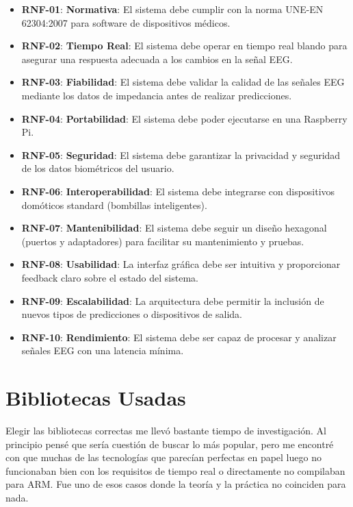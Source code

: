 \begin{itemize}
    \item \textbf{RNF-01}: \textbf{Normativa}: El sistema debe cumplir con la norma UNE-EN 62304:2007 para software de dispositivos médicos.\label{rnf-01}
    \item \textbf{RNF-02}: \textbf{Tiempo Real}: El sistema debe operar en tiempo real blando para asegurar una respuesta adecuada a los cambios en la señal EEG.\label{rnf-02}
    \item \textbf{RNF-03}: \textbf{Fiabilidad}: El sistema debe validar la calidad de las señales EEG mediante los datos de impedancia antes de realizar predicciones.\label{rnf-03}
    \item \textbf{RNF-04}: \textbf{Portabilidad}: El sistema debe poder ejecutarse en una Raspberry Pi.\label{rnf-04}
    \item \textbf{RNF-05}: \textbf{Seguridad}: El sistema debe garantizar la privacidad y seguridad de los datos biométricos del usuario.\label{rnf-05}
    \item \textbf{RNF-06}: \textbf{Interoperabilidad}: El sistema debe integrarse con dispositivos domóticos standard (bombillas inteligentes).\label{rnf-06}
    \item \textbf{RNF-07}: \textbf{Mantenibilidad}: El sistema debe seguir un diseño hexagonal (puertos y adaptadores) para facilitar su mantenimiento y pruebas.\label{rnf-07}
    \item \textbf{RNF-08}: \textbf{Usabilidad}: La interfaz gráfica debe ser intuitiva y proporcionar feedback claro sobre el estado del sistema.\label{rnf-08}
    \item \textbf{RNF-09}: \textbf{Escalabilidad}: La arquitectura debe permitir la inclusión de nuevos tipos de predicciones o dispositivos de salida.\label{rnf-09}
    \item \textbf{RNF-10}: \textbf{Rendimiento}: El sistema debe ser capaz de procesar y analizar señales EEG con una latencia mínima.\label{rnf-10}
\end{itemize}

\newpage

\section{Bibliotecas Usadas}

Elegir las bibliotecas correctas me llevó bastante tiempo de investigación. Al principio pensé que sería cuestión de buscar lo más popular, pero me encontré con que muchas de las tecnologías que parecían perfectas en papel luego no funcionaban bien con los requisitos de tiempo real o directamente no compilaban para ARM. Fue uno de esos casos donde la teoría y la práctica no coinciden para nada.

